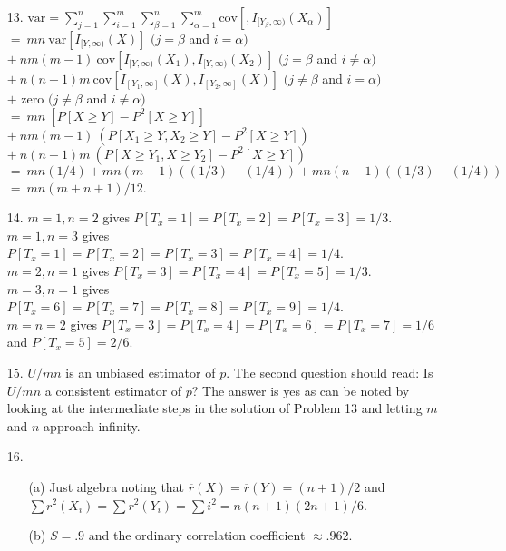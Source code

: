 \begin{enumerate}
	\item[13.] $\mbox{var} = \sum\limits_{j=1}^n\sum\limits_{i=1}^m\sum\limits_{\beta=1}^n\sum\limits_{\alpha=1}^m\mbox{cov}[, I_{[Y_\beta,\infty)}(X_\alpha)]$ \\
	$=\ mn\ \mbox{var}[I_{[Y,\infty)}(X)]$ \hfill $(j = \beta$ and $i = \alpha)$ \\
	$+\ nm(m-1)\ \mbox{cov}[I_{[Y,\infty)}(X_1), I_{[Y,\infty)}(X_2)]$ \hfill $(j = \beta$ and $i \neq \alpha)$ \\
	$+\ n(n-1)m\ \mbox{cov}[I_{[Y_1,\infty]}(X), I_{[Y_2,\infty]}(X)]$ \hfill $(j \neq \beta$ and $i = \alpha)$ \\
	$+$ zero \hfill \hfill $(j \neq \beta$ and $i \neq \alpha)$ \\
	$=\ mn\ [P[X\ge Y] - P^2[X\ge Y]]$ \\
	$+\  nm(m-1)\ (P[X_1\ge Y, X_2\ge Y] - P^2[X\ge Y])$ \\
	$+\  n(n-1)m\ (P[X\ge Y_1, X\ge Y_2] - P^2[X\ge Y])$ \\
	$=\ mn(1/4) + mn(m-1)((1/3)-(1/4)) + mn(n-1)((1/3)-(1/4))$ \\
	$=\ mn(m+n+1)/12$.
	
	\newpage
	\item[14.] $m=1, n=2$ gives $P[T_x=1]=P[T_x=2]=P[T_x=3]=1/3$. \\
			$m=1, n=3$ gives $P[T_x=1]=P[T_x=2]=P[T_x=3]=P[T_x=4]=1/4$. \\
			$m=2, n=1$ gives $P[T_x=3]=P[T_x=4]=P[T_x=5]=1/3$. \\
			$m=3, n=1$ gives $P[T_x=6]=P[T_x=7]=P[T_x=8]=P[T_x=9]=1/4$. \\
			$m=n=2$ gives $P[T_x=3]=P[T_x=4]=P[T_x=6]=P[T_x=7]=1/6$ and $P[T_x=5]=2/6$. 
	
	\item[15.] $U/mn$ is an unbiased estimator of $p$. The second question should read: Is $U/mn$ a consistent estimator of $p$? The answer is yes as can be noted by looking at the intermediate steps in the solution of Problem 13 and letting $m$ and $n$ approach infinity.
	
	\item[16.] \begin{enumerate}
		\item[(a)] Just algebra noting that $\overline{r}(X)=\overline{r}(Y) = (n+1)/2$ and $\sum r^2(X_i)=\sum r^2(Y_i) = \sum i^2 = n(n+1)(2n+1)/6$.
		\item[(b)] $S=.9$ and the ordinary correlation coefficient $\approx .962$.
	\end{enumerate}
	

\end{enumerate}
